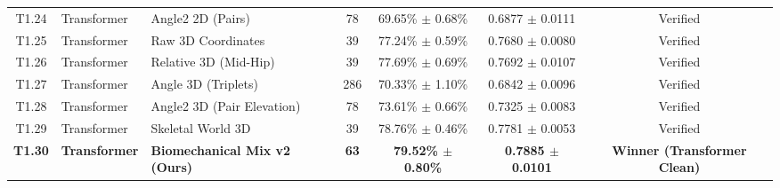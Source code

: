 \documentclass[preprint,12pt]{elsarticle}
\begin{document}
\begin{table}[!t]
{\begin{tabular}{c l l c c c c}
T1.24 & Transformer & Angle2 2D (Pairs) & 78 & 69.65\% $\pm$ 0.68\% & 0.6877 $\pm$ 0.0111 & Verified \\
T1.25 & Transformer & Raw 3D Coordinates & 39 & 77.24\% $\pm$ 0.59\% & 0.7680 $\pm$ 0.0080 & Verified \\
T1.26 & Transformer & Relative 3D (Mid-Hip) & 39 & 77.69\% $\pm$ 0.69\% & 0.7692 $\pm$ 0.0107 & Verified \\
T1.27 & Transformer & Angle 3D (Triplets) & 286 & 70.33\% $\pm$ 1.10\% & 0.6842 $\pm$ 0.0096 & Verified \\
T1.28 & Transformer & Angle2 3D (Pair Elevation) & 78 & 73.61\% $\pm$ 0.66\% & 0.7325 $\pm$ 0.0083 & Verified \\
T1.29 & Transformer & Skeletal World 3D & 39 & 78.76\% $\pm$ 0.46\% & 0.7781 $\pm$ 0.0053 & Verified \\
\textbf{T1.30} & \textbf{Transformer} & \textbf{Biomechanical Mix v2 (Ours)} & \textbf{63} & \textbf{79.52\% $\pm$ 0.80\%} & \textbf{0.7885 $\pm$ 0.0101} & \textbf{Winner (Transformer Clean)} \\
\bottomrule
\end{tabular}
}
\end{table}

\begin{table}[!t]
\centering
\caption{Systematic comparison of temporal sequential backbones across metric World 3D (39-d) and Biomechanical Mix v2 (63-d) representations on the validation partition ($N=2,075$ windows). Reported as $\text{Mean} \pm \text{SD}$ across 3 independent random seeds ($42, 123, 3407$).}
\label{tab:table1}
\end{table}
\end{document}

